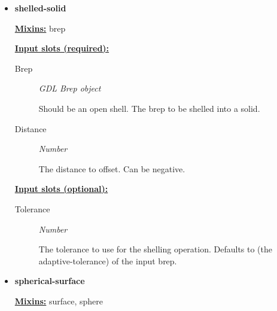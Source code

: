 \documentclass [11pt]{book}
\begin{document}
\begin{itemize}
\item {}
\label{prim:shelled-solid}
\textbf{shelled-solid}


\textbf{
\underline{Mixins:}} brep





\begin{description}

\end{description}








\textbf{
\underline{Input slots (required):}}

\begin{description}

\item [Brep]
\emph{GDL Brep object}

 Should be an open shell.
The brep to be shelled into a solid.




\item [Distance]
\emph{Number}

 The distance to offset. Can be negative.




\end{description}






\textbf{
\underline{Input slots (optional):}}

\begin{description}

\item [Tolerance]
\emph{Number}

 The tolerance to use for the shelling operation.
Defaults to (the adaptive-tolerance) of the input brep.




\end{description}







\item {}
\label{prim:spherical-surface}
\textbf{spherical-surface}


\textbf{
\underline{Mixins:}} surface, sphere






\end{itemize}
\end{document}
